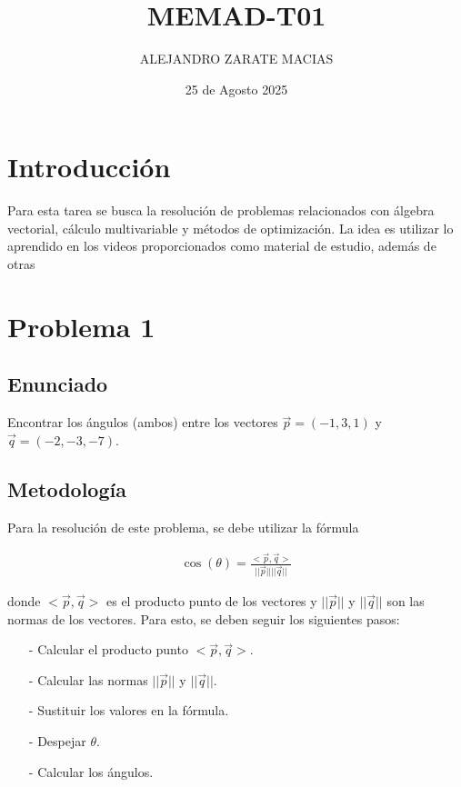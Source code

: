 \documentclass{article}
\title{MEMAD-T01}
\author{ALEJANDRO ZARATE MACIAS}
\date{25 de Agosto 2025}
\begin{document}
\maketitle

\section*{Introducción}

Para esta tarea se busca la resolución de problemas relacionados con álgebra vectorial, cálculo multivariable y métodos de optimización.
La idea es utilizar lo aprendido en los videos proporcionados como material de estudio, además de otras

\section{Problema 1}

\subsection{Enunciado}
Encontrar los ángulos (ambos) entre los vectores $\vec{p} = (-1, 3, 1)$ y $\vec{q} = (-2, -3, -7)$.

\subsection{Metodología}
Para la resolución de este problema, se debe utilizar la fórmula

\begin{align}
\cos(\theta) = \frac{<\vec{p},\vec{q}>}{||\vec{p}|| ||\vec{q}||}
\end{align}

donde $<\vec{p},\vec{q}>$ es el producto punto de los vectores y $||\vec{p}||$ y $||\vec{q}||$ son las normas de los vectores.
Para esto, se deben seguir los siguientes pasos:
\begin{enumerate}
    \item[-]  Calcular el producto punto $<\vec{p},\vec{q}>$.
    \item[-] Calcular las normas $||\vec{p}||$ y $||\vec{q}||$.
    \item[-] Sustituir los valores en la fórmula.
    \item[-] Despejar $\theta$.
    \item[-] Calcular los ángulos.
\end{enumerate}
\end{document}
